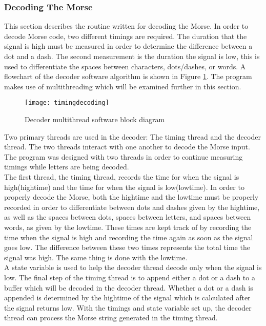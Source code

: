 \documentclass[12pt, letterpaper]{article}
\begin{document}
\subsubsection{Decoding The Morse}
This section describes the routine written for decoding the Morse. In order to decode Morse code, two different timings are required. The duration that the signal is high must be measured in order to determine the difference between a dot and a dash. The second measurement is the duration the signal is low, this is used to differentiate the spaces between characters, dots/dashes, or words. A flowchart of the decoder software algorithm is shown in Figure \ref{Ass5}. The program makes use of multithreading which will be examined further in this section.

\begin{figure}[H]
    \centering
    \texttt{[image: timingdecoding]}
    \caption{Decoder multithread software block diagram}
    \label{Ass5}
\end{figure}

Two primary threads are used in the decoder: The timing thread and the decoder thread. The two threads interact with one another to decode the Morse input. The program was designed with two threads in order to continue measuring timings while letters are being decoded. \\

The first thread, the timing thread, records the time for when the signal is high(hightime) and the time for when the signal is low(lowtime). In order to properly decode the Morse, both the hightime and the lowtime must be properly recorded in order to differentiate between dots and dashes given by the hightime, as well as the spaces between dots, spaces between letters, and spaces between words, as given by the lowtime. These times are kept track of by recording the time when the signal is high and recording the time again as soon as the signal goes low. The difference between these two times represents the total time the signal was high. The same thing is done with the lowtime.\\

A state variable is used to help the decoder thread decode only when the signal is low. The final step of the timing thread is to append either a dot or a dash to a buffer which will be decoded in the decoder thread. Whether a dot or a dash is appended is determined by the hightime of the signal which is calculated after the signal returns low. With the timings and state variable set up, the decoder thread can process the Morse string generated in the timing thread. \\ 
\end{document}
